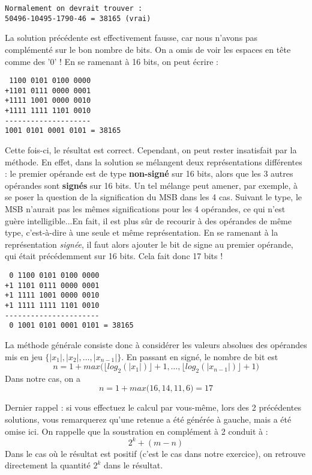 \documentclass[a4paper,11pt]{article}
\begin{document}
\begin{enumerate}
\begin{verbatim}
Normalement on devrait trouver :
50496-10495-1790-46 = 38165 (vrai)
\end{verbatim}

La solution précédente est effectivement fausse, car nous n'avons pas complémenté sur le bon nombre de bits. On a omis de voir les espaces en tête comme des '0' !
En se ramenant à 16 bits, on peut écrire :

\begin{verbatim}
 1100 0101 0100 0000
+1101 0111 0000 0001
+1111 1001 0000 0010
+1111 1111 1101 0010
--------------------
1001 0101 0001 0101 = 38165
\end{verbatim}

Cette fois-ci, le  résultat est correct. Cependant, on peut rester insatisfait par la méthode. En effet, dans la solution se mélangent
deux représentations différentes : le premier opérande est de type {\bf non-signé} sur 16 bits, alors que les 3 autres opérandes sont {\bf signés} sur 16 bits. Un tel
mélange peut amener, par exemple, à se poser la question de la signification du MSB dans les 4 cas.
Suivant le type, le MSB n'aurait pas les mêmes significations pour les 4 opérandes, ce qui n'est guère intelligible...En fait, il est plus sûr de recourir à des opérandes de même type, c'est-à-dire à une seule et même représentation. En se ramenant à la représentation {\it signée},
il faut alors ajouter le bit de signe au premier opérande, qui était précédemment sur 16 bits. Cela fait donc 17 bits !
\begin{verbatim}
 0 1100 0101 0100 0000
+1 1101 0111 0000 0001
+1 1111 1001 0000 0010
+1 1111 1111 1101 0010
----------------------
 0 1001 0101 0001 0101 = 38165
\end{verbatim}

La méthode générale consiste donc à considérer les valeurs absolues des opérandes mis en jeu $\{|x_1|,|x_2|,\dots,|x_{n-1}|\}$.
En passant en signé, le nombre de bit est
$$ n = 1 + max \Big( \lfloor log_2(|x_1|) \rfloor + 1,\dots,\lfloor log_2 (|x_{n-1}|) \rfloor + 1\Big)$$
Dans notre cas, on a
$$n= 1 + max \Big(16,14,11,6\Big) = 17 $$


Dernier rappel :  si vous effectuez le calcul par vous-même, lors des 2 précédentes solutions, vous remarquerez qu'une retenue a été générée à gauche, mais a été omise ici.
On rappelle que la soustration en complément à 2 conduit à : $$2^k+(m-n)$$ Dans le cas où le résultat est positif (c'est le cas dans notre exercice), on retrouve directement
la quantité $2^k$ dans le résultat.


\end{enumerate}
\end{document}
